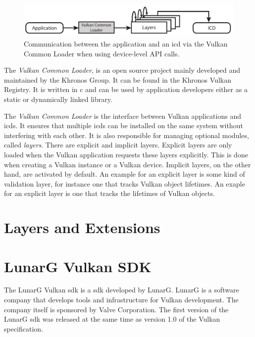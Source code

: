     \begin{figure}
      \includegraphics{Main/Images/VulkanLoaderDeviceLayers}
      \centering
      \caption{Communication between the application and an \gls{icd} via the Vulkan Common Loader when using device-level API calls.}
      \label{fig:VulkanLoaderWithDeviceLayers}
    \end{figure}

    The \textit{Vulkan Common Loader}, is an open source project mainly developed and maintained by the Khronos Group. It can be found in the Khronos Vulkan Registry\cite{vulkanregistry}. It is written in \gls{c} and can be used by application developers either as a static or dynamically linked library.

    The \textit{Vulkan Common Loader} is the interface between Vulkan applications and \glspl{icd}. It ensures that multiple \glspl{icd} can be installed on the same system without interfering with each other. It is also responsible for managing optional modules, called \textit{layers}. There are explicit and implicit layers. Explicit layers are only loaded when the Vulkan application requests these layers explicitly. This is done when creating a Vulkan instance or a Vulkan device. Implicit layers, on the other hand, are activated by default. An example for an explicit layer is some kind of validation layer, for instance one that tracks Vulkan object lifetimes. An exaple for an explicit layer is one that tracks the lifetimes of Vulkan objects.





  \section{Layers and Extensions}
  \label{sec:EnvLayersAndExtensions}
    \tbd


  \section{LunarG Vulkan SDK}
  \label{sec:LunarGSDK}
    The LunarG Vulkan \acrshort{sdk}\cite{lunargvulkansdk} is a \acrfull{sdk} developed by LunarG. LunarG is a software company that develops tools and infrastructure for Vulkan development. The company itself is sponsored by Valve Corporation. The first version of the LunarG \gls{sdk} was released at the same time as version 1.0 of the Vulkan specification.

